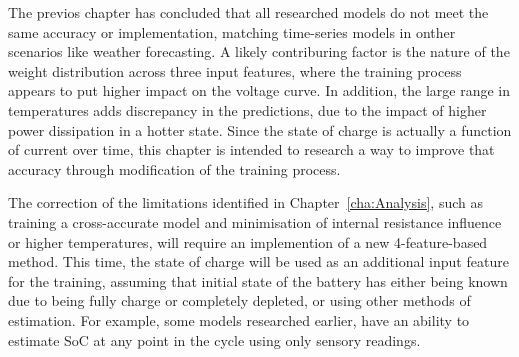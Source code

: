 The previos chapter has concluded that all researched models do not meet the same accuracy or implementation, matching time-series models in onther scenarios like weather forecasting.
A likely contriburing factor is the nature of the weight distribution across three input features, where the training process appears to put higher impact on the voltage curve.
In addition, the large range in temperatures adds discrepancy in the predictions, due to the impact of higher power dissipation in a hotter state.
Since the state of charge is actually a function of current over time, this chapter is intended to research a way to improve that accuracy through modification of the training process.


%
%
The correction of the limitations identified in Chapter~\ref{cha:Analysis}, such as training a cross-accurate model and minimisation of internal resistance influence or higher temperatures, will require an implemention of a new 4-feature-based method.
This time, the state of charge will be used as an additional input feature for the training, assuming that initial state of the battery has either being known due to being fully charge or completely depleted, or using other methods of estimation.
For example, some models researched earlier, have an ability to estimate SoC at any point in the cycle using only sensory readings.

